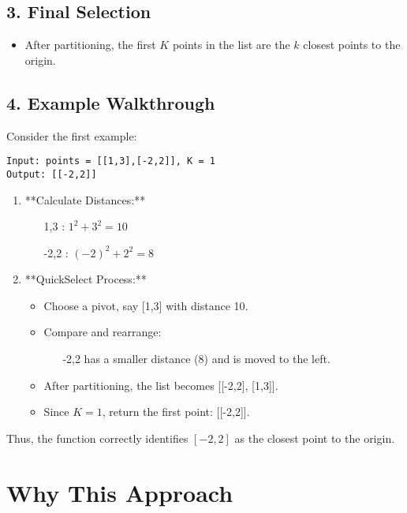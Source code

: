 \subsection*{3. Final Selection}

\begin{itemize}
    \item After partitioning, the first \(K\) points in the list are the \(k\) closest points to the origin.
\end{itemize}

\subsection*{4. Example Walkthrough}

Consider the first example:
\begin{verbatim}
Input: points = [[1,3],[-2,2]], K = 1
Output: [[-2,2]]
\end{verbatim}

\begin{enumerate}
    \item **Calculate Distances:**
    \begin{itemize}
        \item [1,3] : \(1^2 + 3^2 = 10\)
        \item [-2,2] : \((-2)^2 + 2^2 = 8\)
    \end{itemize}
    
    \item **QuickSelect Process:**
    \begin{itemize}
        \item Choose a pivot, say [1,3] with distance 10.
        \item Compare and rearrange:
        \begin{itemize}
            \item [-2,2] has a smaller distance (8) and is moved to the left.
        \end{itemize}
        \item After partitioning, the list becomes [[-2,2], [1,3]].
        \item Since \(K = 1\), return the first point: [[-2,2]].
    \end{itemize}
\end{enumerate}

Thus, the function correctly identifies \([-2,2]\) as the closest point to the origin.

\section*{Why This Approach}

